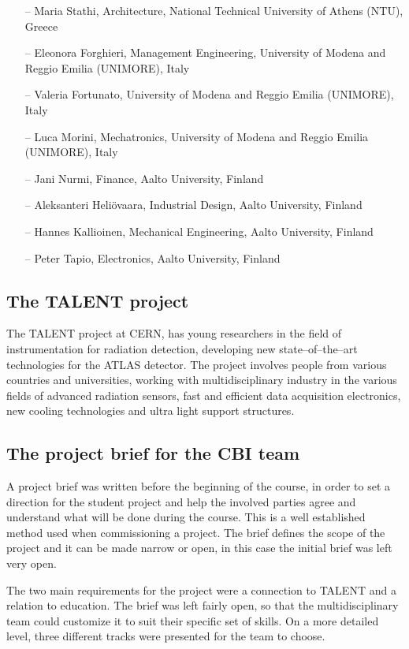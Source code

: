 \documentclass[english,12pt,a4paper,dvips]{article}
\begin{document}
\begin{itemize}
\item[--] Maria Stathi, Architecture, National Technical University of Athens (NTU), Greece
\item[--] Eleonora Forghieri, Management Engineering, University of Modena and Reggio Emilia (UNIMORE), Italy
\item[--] Valeria Fortunato, University of Modena and Reggio Emilia (UNIMORE), Italy
\item[--] Luca Morini, Mechatronics, University of Modena and Reggio Emilia (UNIMORE), Italy
\item[--] Jani Nurmi, Finance, Aalto University, Finland
\item[--] Aleksanteri Heliövaara, Industrial Design, Aalto University, Finland
\item[--] Hannes Kallioinen, Mechanical Engineering, Aalto University, Finland
\item[--] Peter Tapio, Electronics, Aalto University, Finland
\end{itemize}

\subsection{The TALENT project}

The TALENT project at CERN, has young researchers in the field of instrumentation for radiation detection, developing new state--of--the--art technologies for the ATLAS detector. The project involves people from various countries and universities, working with multidisciplinary industry in the various fields of advanced radiation sensors, fast and efficient data acquisition electronics, new cooling technologies and ultra light support structures.



\subsection{The project brief for the CBI team}

A project brief was written before the beginning of the course, in order to set a direction for the student project and help the involved parties agree and understand what will be done during the course. This is a well established method used when commissioning a project. The brief defines the scope of the project and it can be made narrow or open, in this case the initial brief was left very open.

The two main requirements for the project were a connection to TALENT and a relation to education. The brief was left fairly open, so that the multidisciplinary team could customize it to suit their specific set of skills. On a more detailed level, three different tracks were presented for the team to choose.
\end{document}
